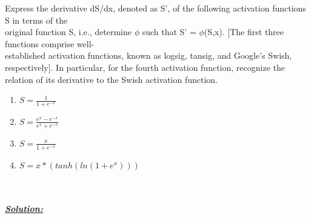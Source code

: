 \documentclass{article}
\begin{document}
\noindent Express the derivative dS/dx, denoted as S', of the following activation functions S in terms of the \\ original function S, i.e., determine ${\phi}$ such that S' = ${\phi}$(S,x). 
[The first three functions comprise well-\\established activation functions, known as logsig, tansig, and Google's Swish, respectively]. In particular, for the fourth activation
function, recognize the relation of its derivative to the Swish activation function.\\
\begin{enumerate}
  \item $S = \frac{1}{1+e^{-x}}$ \\
  \item $S = \frac{e^{x}-e^{-x}}{e^{x}+e^{-x}}$ \\
  \item $S = \frac{x}{1+e^{-x}}$ \\
  \item $S = x*(tanh(ln(1+e^{x})))$ \\
\end{enumerate}
\noindent \\ \\ 
\underline{\textbf{\textit{Solution:}}}
\end{document}
